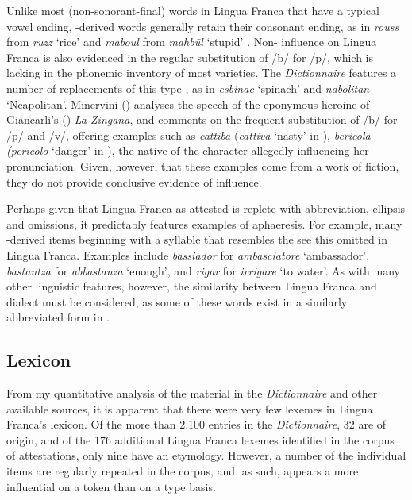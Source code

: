 \documentclass[output=paper]{langsci/langscibook}
\begin{document}
	Unlike most (non-sonorant-final) words in Lingua Franca that have a typical  vowel ending, -derived words generally retain their consonant ending, as in \textit{rouss} from \textit{ruzz} ‘rice’ and \textit{maboul} from \textit{mahbūl} ‘stupid’ \citep[38]{Cifoletti2004}. Non- influence on Lingua Franca is also evidenced in the regular substitution of /b/ for /p/, which is lacking in the phonemic inventory of most  varieties. The \textit{Dictionnaire} features a number of replacements of this type \citep[38]{Cifoletti2004}, as in \textit{esbinac} ‘spinach’ and \textit{nabolitan} ‘Neapolitan’.  Minervini (\citeyear[257–60]{Minervini1996}) analyses the speech of the eponymous heroine of Giancarli’s (\citeyear{Giancarli1545}) \textit{La Zingana}, and comments on the frequent substitution of /b/ for /p/ and /v/, offering examples such as \textit{cattiba} (\textit{cattiva} ‘nasty’ in ), \textit{bericola (pericolo} ‘danger’ in ), the native  of the character allegedly influencing her pronunciation. Given, however, that these examples come from a work of fiction, they do not provide conclusive evidence of influence. 
	
	Perhaps given that Lingua Franca as attested is replete with abbreviation, ellipsis and omissions, it predictably features examples of aphaeresis. For example, many -derived items beginning with a syllable that resembles the    see this omitted in Lingua Franca. Examples include \textit{bassiador} for \textit{ambasciatore} ‘ambassador’, \textit{bastantza} for \textit{abbastanza} ‘enough’, and \textit{rigar} for \textit{irrigare} ‘to water’. As with many other linguistic features, however, the similarity between Lingua Franca and  dialect must be considered, as some of these words exist in a similarly abbreviated form in  \citep{Schuchardt1909}.
	
\subsection{Lexicon}
	
	From my quantitative analysis of the material in the \textit{Dictionnaire} and other available sources, it is apparent that there were very few  lexemes in Lingua Franca’s lexicon. Of the more than 2,100 entries in the \textit{Dictionnaire}, 32 are of  origin, and of the 176 additional Lingua Franca lexemes identified in the corpus of attestations, only nine have an  etymology. However, a number of the individual items are regularly repeated in the corpus, and, as such,  appears a more influential  on a token than on a type basis.
	
\end{document}
